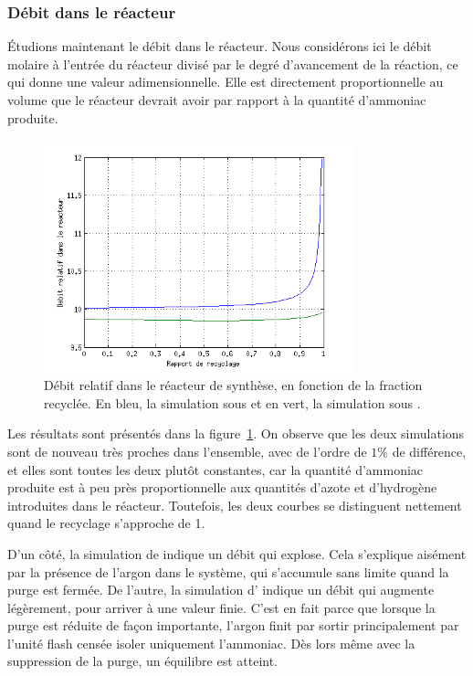 \subsubsection{Débit dans le réacteur}

Étudions maintenant le débit dans le réacteur.
Nous considérons ici le débit molaire à l'entrée du réacteur
divisé par le degré d'avancement de la réaction, ce qui donne une valeur
adimensionnelle.
Elle est directement proportionnelle au volume que le réacteur devrait
avoir par rapport à la quantité d'ammoniac produite.

\begin{figure}
    \centering
    \includegraphics[width=0.8\textwidth]{img/in-reac}
    \caption{
        Débit relatif dans le réacteur de synthèse,
        en fonction de la fraction recyclée.
        En bleu, la simulation sous \matlab{} et en vert,
        la simulation sous \aspen{}.
    }
    \label{fig:in-reac}
\end{figure}

Les résultats sont présentés dans la figure~\ref{fig:in-reac}.
On observe que les deux simulations sont de nouveau très proches
dans l'ensemble, avec de l'ordre de $1\%$ de différence,
et elles sont toutes les deux plutôt constantes,
car la quantité d'ammoniac produite est à peu près proportionnelle aux
quantités d'azote et d'hydrogène introduites dans le réacteur.
Toutefois, les deux courbes se distinguent nettement quand
le recyclage s'approche de 1.

D'un côté, la simulation de \matlab{} indique un débit qui explose.
Cela s'explique aisément par la présence de l'argon dans le système,
qui s'accumule sans limite quand la purge est fermée.
De l'autre, la simulation d'\aspen{} indique un débit qui augmente légèrement,
pour arriver à une valeur finie. C'est en fait parce que lorsque
la purge est réduite de façon importante, l'argon finit par sortir
principalement par l'unité flash censée isoler uniquement l'ammoniac.
Dès lors même avec la suppression de la purge, un équilibre est atteint.

